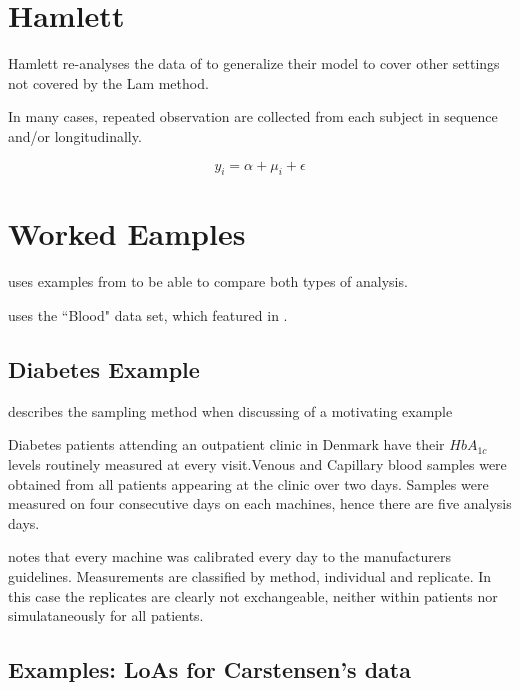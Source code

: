 \documentclass[12pt, a4paper]{article}
\theoremstyle{plain}
\theoremstyle{definition}
\theoremstyle{remark}
\begin{document}
		
		
		
	
	
	
	
	
	
	

	\section{Hamlett}
	Hamlett re-analyses the data of \citet{lam} to generalize their model to cover other settings not covered by the Lam method.
	
	In many cases, repeated observation are collected from each subject in sequence  and/or longitudinally.
	
	
	\[ y_i = \alpha + \mu_i + \epsilon \]

		\newpage	

	\section{Worked Eamples}
	
	\citet{ARoy2009} uses examples from \citet{BA86} to be able to
	compare both types of analysis.
	
	\citet{Roy2006} uses the ``Blood" data set, which featured in \citet{BA99}.
	
\subsection{Diabetes Example}
\citet{bxc2008} describes the sampling method when discussing of a motivating example

Diabetes patients attending an outpatient clinic in Denmark have their $HbA_{1c}$ levels routinely measured at every visit.Venous and Capillary blood samples were obtained from all patients appearing at the clinic over two days.
Samples were measured on four consecutive days on each machines, hence there are five analysis days.

\citet{bxc2008} notes that every machine was calibrated every day to  the manufacturers guidelines.
Measurements are classified by method, individual and replicate. In this case the replicates are clearly not exchangeable, neither within patients nor simulataneously for all patients.
		
\subsection{Examples: LoAs for Carstensen's data}
\end{document}
